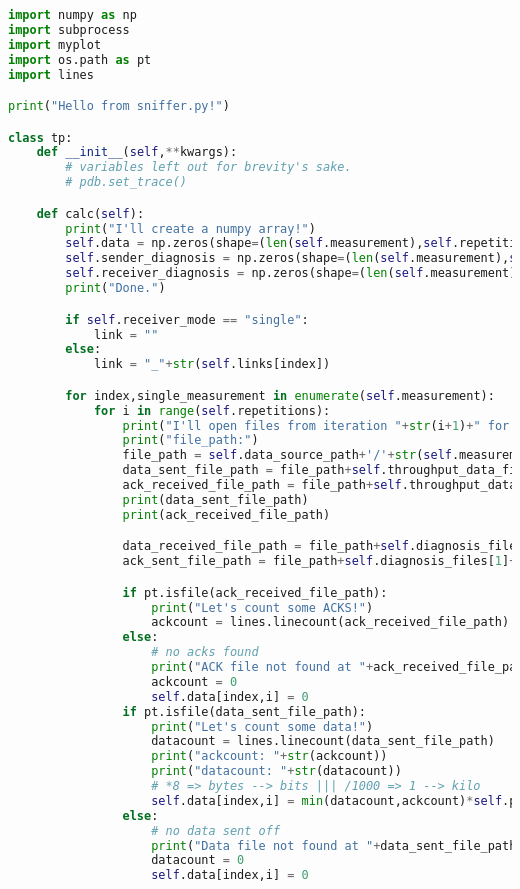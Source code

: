 \begin{lstlisting}[language=Python,caption=sniffer.py]
import numpy as np
import subprocess
import myplot
import os.path as pt
import lines

print("Hello from sniffer.py!")

class tp:
    def __init__(self,**kwargs):
        # variables left out for brevity's sake.
        # pdb.set_trace()

    def calc(self):
        print("I'll create a numpy array!")
        self.data = np.zeros(shape=(len(self.measurement),self.repetitions))
        self.sender_diagnosis = np.zeros(shape=(len(self.measurement),self.repetitions))
        self.receiver_diagnosis = np.zeros(shape=(len(self.measurement),self.repetitions))
        print("Done.")

        if self.receiver_mode == "single":
            link = ""
        else:
            link = "_"+str(self.links[index])

        for index,single_measurement in enumerate(self.measurement):
            for i in range(self.repetitions):
                print("I'll open files from iteration "+str(i+1)+" for you!")
                print("file_path:")
                file_path = self.data_source_path+'/'+str(self.measurement[index])+'/'+str(i+1)+'/'
                data_sent_file_path = file_path+self.throughput_data_files[0]+link+".txt"
                ack_received_file_path = file_path+self.throughput_data_files[1]+"_"+str(self.links[index])+".txt"
                print(data_sent_file_path)
                print(ack_received_file_path)

                data_received_file_path = file_path+self.diagnosis_files[0]+link+".txt"
                ack_sent_file_path = file_path+self.diagnosis_files[1]+link+".txt"

                if pt.isfile(ack_received_file_path):
                    print("Let's count some ACKS!")
                    ackcount = lines.linecount(ack_received_file_path)
                else:
                    # no acks found
                    print("ACK file not found at "+ack_received_file_path+".")
                    ackcount = 0
                    self.data[index,i] = 0
                if pt.isfile(data_sent_file_path):
                    print("Let's count some data!")
                    datacount = lines.linecount(data_sent_file_path)
                    print("ackcount: "+str(ackcount))
                    print("datacount: "+str(datacount))
                    # *8 => bytes --> bits ||| /1000 => 1 --> kilo
                    self.data[index,i] = min(datacount,ackcount)*self.packet_size/self.timer*8/1000
                else:
                    # no data sent off
                    print("Data file not found at "+data_sent_file_path+".")
                    datacount = 0
                    self.data[index,i] = 0


\end{lstlisting}
